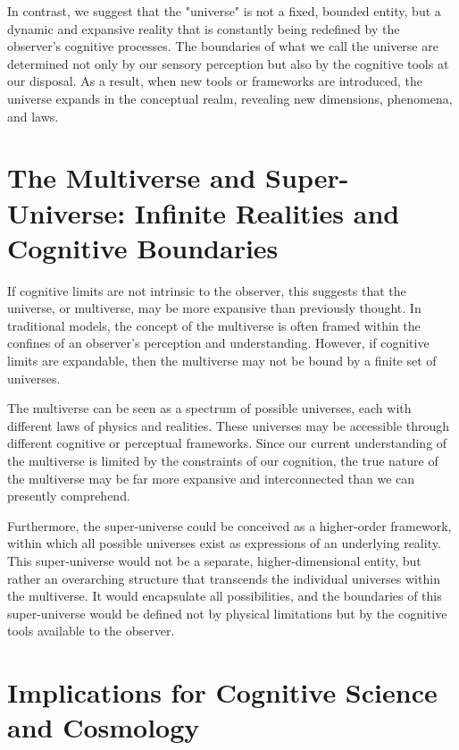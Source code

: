 \documentclass[twocolumn]{article}
\begin{document}
    In contrast, we suggest that the "universe" is not a fixed, bounded entity, but a dynamic and expansive reality
    that is constantly being redefined by the observer's cognitive processes.
    The boundaries of what we call the universe are determined not only by our sensory perception
    but also by the cognitive tools at our disposal.
    As a result, when new tools or frameworks are introduced,
    the universe expands in the conceptual realm, revealing new dimensions, phenomena, and laws.


    \section{The Multiverse and Super-Universe: Infinite Realities and Cognitive Boundaries}
    \label{sec:the-multiverse-and-super-universe:-infinite-realities-and-cognitive-boundaries}

    If cognitive limits are not intrinsic to the observer, this suggests that the universe, or multiverse,
    may be more expansive than previously thought.
    In traditional models, the concept of the multiverse is often framed within the confines
    of an observer's perception and understanding.
    However, if cognitive limits are expandable,
    then the multiverse may not be bound by a finite set of universes.

    The multiverse can be seen as a spectrum of possible universes, each with different laws of physics and realities.
    These universes may be accessible through different cognitive or perceptual frameworks.
    Since our current understanding of the multiverse is limited by the constraints of our cognition,
    the true nature of the multiverse may be far more expansive and interconnected than we can presently comprehend.

    Furthermore, the super-universe could be conceived as a higher-order framework,
    within which all possible universes exist as expressions of an underlying reality.
    This super-universe would not be a separate, higher-dimensional entity,
    but rather an overarching structure that transcends the individual universes within the multiverse.
    It would encapsulate all possibilities, and the boundaries of this super-universe would be defined
    not by physical limitations but by the cognitive tools available to the observer.

    \lipsum[5-6]


    \section{Implications for Cognitive Science and Cosmology}
    \label{sec:implications-for-cognitive-science-and-cosmology}
\end{document}
